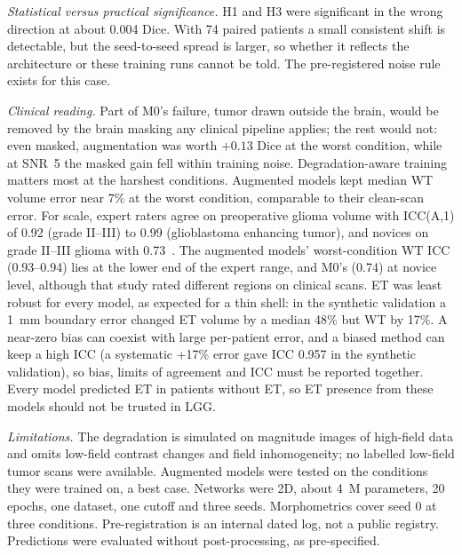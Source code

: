 \documentclass[conference]{IEEEtran}
\begin{document}
\textit{Statistical versus practical significance.} H1 and H3 were significant in the wrong direction at about
0.004 Dice. With 74 paired patients a small consistent shift is detectable, but the seed-to-seed spread is
larger, so whether it reflects the architecture or these training runs cannot be told. The pre-registered noise
rule exists for this case.

\textit{Clinical reading.} Part of M0's failure, tumor drawn outside the brain, would be removed by the brain
masking any clinical pipeline applies; the rest would not: even masked, augmentation was worth $+0.13$ Dice at
the worst condition, while at SNR~5 the masked gain fell within training noise. Degradation-aware training
matters most at the harshest conditions. Augmented models kept median WT volume error near 7\%
at the worst condition, comparable to their clean-scan error. For scale, expert raters agree on preoperative
glioma volume with ICC(A,1) of 0.92 (grade II--III) to 0.99 (glioblastoma enhancing tumor), and novices on
grade II--III glioma with 0.73~\cite{visser2019interrater}. The augmented models' worst-condition WT ICC
(0.93--0.94) lies at the lower end of the expert range, and M0's (0.74) at novice level, although that study
rated different regions on clinical scans. ET was least robust for every model, as expected for a thin shell: in the synthetic validation a 1~mm boundary
error changed ET volume by a median 48\% but WT by 17\%. A near-zero bias can coexist with large per-patient
error, and a biased method can keep a high ICC (a systematic +17\% error gave ICC 0.957 in the synthetic
validation), so bias, limits of agreement and ICC must be reported together. Every model predicted ET in
patients without ET, so ET presence from these models should not be trusted in LGG.

\textit{Limitations.} The degradation is simulated on magnitude images of high-field data and omits low-field
contrast changes and field inhomogeneity; no labelled low-field tumor scans were available. Augmented models were
tested on the conditions they were trained on, a best case. Networks were 2D, about 4~M parameters, 20 epochs,
one dataset, one cutoff and three seeds. Morphometrics cover seed 0 at three conditions. Pre-registration is an
internal dated log, not a public registry. Predictions were evaluated without post-processing, as pre-specified.

\end{document}
